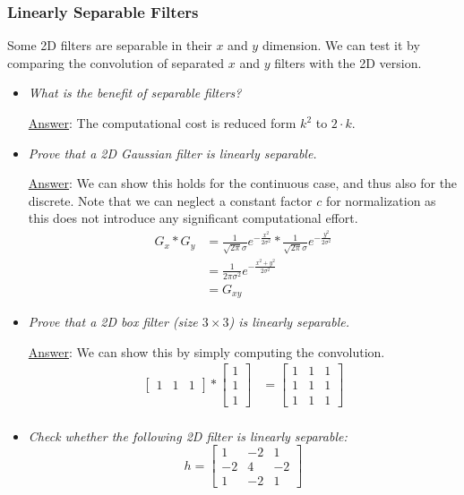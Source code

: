 \subsubsection{Linearly Separable Filters}
Some 2D filters are separable in their $x$ and $y$ dimension. We can test it by comparing the convolution of separated $x$ and $y$ filters with the 2D version.
\begin{itemize}
	\item \textit{What is the benefit of separable filters?}
	
	\underline{Answer}: The computational cost is reduced form $k^2$ to $2\cdot k$.
	
	\item \textit{Prove that a 2D Gaussian filter is linearly separable.}
	
	\underline{Answer}: We can show this holds for the continuous case, and thus also for the discrete. Note that we can neglect a constant factor $c$ for normalization as this does not introduce any significant computational effort.
	\begin{equation*}
		\begin{split}
			G_x * G_y  & = \frac{1}{\sqrt{2\pi}\sigma} e^{-\frac{x^2}{2\sigma^2}} * \frac{1}{\sqrt{2\pi}\sigma} e^{-\frac{y^2}{2\sigma^2}}\\
			& = \frac{1}{2\pi\sigma^2} e^{-\frac{x^2 + y^2}{2\sigma^2}}\\
			& = G_{xy}
		\end{split}
	\end{equation*}
	\item \textit{Prove that a 2D box filter (size $3\times 3$) is linearly separable.}
	
	\underline{Answer}: We can show this by simply computing the convolution.
	\begin{equation*}
	\begin{split}
		\left[\begin{array}{ccc}1 & 1 & 1\end{array}\right] *  
		\left[\begin{array}{c}1 \\ 1 \\ 1\end{array}\right] & = \left[\begin{array}{ccc}
		1 & 1 & 1\\ 1 & 1 & 1\\ 1 & 1 & 1
		\end{array}\right]\\
	\end{split}
	\end{equation*}
	\item \textit{Check whether the following 2D filter is linearly separable:}
	$$h = \left[\begin{array}{ccc}
	1 & -2 & 1\\ -2 & 4 & -2\\ 1 & -2 & 1
	\end{array}\right]$$
	

\end{itemize}
